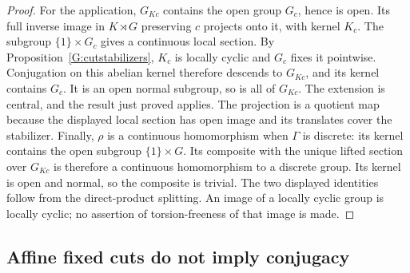 \begin{proof}
For the application, $G_{Kc}$ contains the open group $G_c$, hence
is open. Its full inverse image in $K\rtimes G$ preserving $c$
projects onto it, with kernel $K_c$. The subgroup
$\{1\}\times G_c$ gives a continuous local section.
By Proposition~\ref{G:cutstabilizers}, $K_c$ is locally cyclic
and $G_c$ fixes it pointwise. Conjugation on this abelian kernel
therefore descends to $G_{Kc}$, and its kernel contains $G_c$.
It is an open normal subgroup, so is all of $G_{Kc}$. The
extension is central, and the result just proved applies.
The projection is a quotient map because the displayed local
section has open image and its translates cover the stabilizer.
Finally, $\rho$ is a continuous homomorphism when $\Gamma$ is
discrete: its kernel contains the open subgroup $\{1\}\times G$.
Its composite with the unique lifted section over $G_{Kc}$ is
therefore a continuous homomorphism to a discrete group. Its
kernel is open and normal, so the composite is trivial. The two
displayed identities follow from the direct-product splitting.
An image of a locally cyclic group is locally cyclic; no
assertion of torsion-freeness of that image is made.
\end{proof}


\subsection{Affine fixed cuts do not imply conjugacy}

